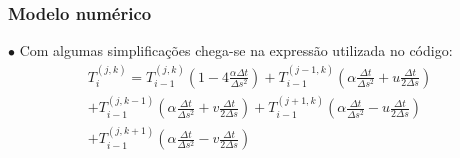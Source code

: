 \documentclass[xcolor=dvipsnames,10pt,aspectratio=169]{beamer}
\begin{document}
	\begin{frame} 
	\frametitle{Modelo numérico}
	$\bullet$ Com algumas simplificações chega-se na expressão utilizada no código:
	\begin{equation}
	\begin{split}
	T_i^{(j,k)} = T_{i -1}^{(j,k)} \left( 1 - 4 \frac{\alpha \Delta t}{\Delta s ^2}\right) + T_{i -1}^{(j-1,k)} \left( \alpha \frac{\Delta t}{\Delta s^2} + u \frac{\Delta t}{2 \Delta s} \right)\\
	+ T_{i -1}^{(j,k-1)} \left( \alpha \frac{\Delta t}{\Delta s^2} + v \frac{\Delta t}{2 \Delta s} \right) +  T_{i-1}^{(j + 1,k)} \left( \alpha \frac{\Delta t}{ \Delta s^2} - u \frac{\Delta t}{2 \Delta s}\right) \\
	+  T_{i-1}^{(j,k+1)} \left( \alpha \frac{\Delta t}{\Delta s^2} - v \frac{\Delta t}{2 \Delta s}\right)
	\end{split}
	\end{equation}
	
	\end{frame}
	
	
	
	
	
\end{document}
